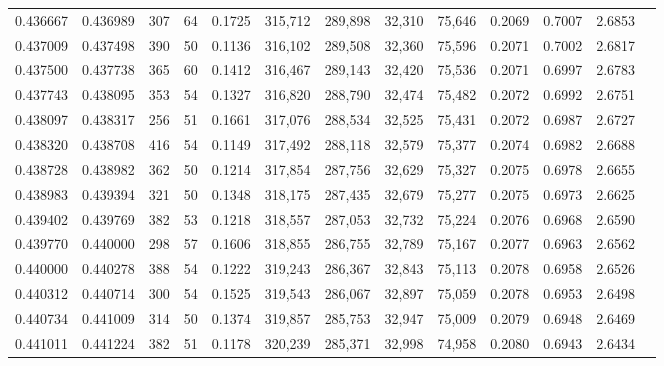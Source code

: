 \begin{tabular}{rrrrrrrrrrrrr}
0.436667 & 0.436989 &    307 &    64 &                                     0.1725 & 315,712 & 289,898 &  32,310 &  75,646 & 0.2069 & 0.7007 & 2.6853 \\
0.437009 & 0.437498 &    390 &    50 &                                     0.1136 & 316,102 & 289,508 &  32,360 &  75,596 & 0.2071 & 0.7002 & 2.6817 \\
0.437500 & 0.437738 &    365 &    60 &                                     0.1412 & 316,467 & 289,143 &  32,420 &  75,536 & 0.2071 & 0.6997 & 2.6783 \\
0.437743 & 0.438095 &    353 &    54 &                                     0.1327 & 316,820 & 288,790 &  32,474 &  75,482 & 0.2072 & 0.6992 & 2.6751 \\
0.438097 & 0.438317 &    256 &    51 &                                     0.1661 & 317,076 & 288,534 &  32,525 &  75,431 & 0.2072 & 0.6987 & 2.6727 \\
0.438320 & 0.438708 &    416 &    54 &                                     0.1149 & 317,492 & 288,118 &  32,579 &  75,377 & 0.2074 & 0.6982 & 2.6688 \\
0.438728 & 0.438982 &    362 &    50 &                                     0.1214 & 317,854 & 287,756 &  32,629 &  75,327 & 0.2075 & 0.6978 & 2.6655 \\
0.438983 & 0.439394 &    321 &    50 &                                     0.1348 & 318,175 & 287,435 &  32,679 &  75,277 & 0.2075 & 0.6973 & 2.6625 \\
0.439402 & 0.439769 &    382 &    53 &                                     0.1218 & 318,557 & 287,053 &  32,732 &  75,224 & 0.2076 & 0.6968 & 2.6590 \\
0.439770 & 0.440000 &    298 &    57 &                                     0.1606 & 318,855 & 286,755 &  32,789 &  75,167 & 0.2077 & 0.6963 & 2.6562 \\
0.440000 & 0.440278 &    388 &    54 &                                     0.1222 & 319,243 & 286,367 &  32,843 &  75,113 & 0.2078 & 0.6958 & 2.6526 \\
0.440312 & 0.440714 &    300 &    54 &                                     0.1525 & 319,543 & 286,067 &  32,897 &  75,059 & 0.2078 & 0.6953 & 2.6498 \\
0.440734 & 0.441009 &    314 &    50 &                                     0.1374 & 319,857 & 285,753 &  32,947 &  75,009 & 0.2079 & 0.6948 & 2.6469 \\
0.441011 & 0.441224 &    382 &    51 &                                     0.1178 & 320,239 & 285,371 &  32,998 &  74,958 & 0.2080 & 0.6943 & 2.6434 \\

\end{tabular}
